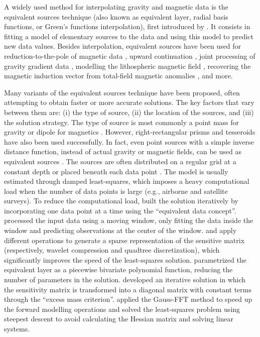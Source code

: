 \documentclass[twocolumn]{article}
\begin{document}
A widely used method for interpolating gravity and magnetic data
is the equivalent sources technique (also known as equivalent layer, radial
basis functions, or Green's functions interpolation), first introduced by
\citet{dampney1969}.
It consists in fitting a model of elementary sources to the data and using this
model to predict new data values.
Besides interpolation, equivalent sources have been used for
reduction-to-the-pole of magnetic data
\citep{silva1986, nakatsuka2006, guspi2009}, upward
continuation \citep{emilia1973, li2010}, joint processing of gravity gradient
data \citep{barnes2011}, modelling the lithospheric magnetic field
\citep{kother2015}, recovering the magnetic induction vector from
total-field magnetic anomalies \citep{li2020}, and more.

Many variants of the equivalent sources technique have been proposed, often
attempting to obtain faster or more accurate solutions.
The key factors that vary between them are: (i) the type of source, (ii)
the location of the sources, and (iii) the solution strategy.
The type of source is most commonly a point mass for gravity or dipole for
magnetics \citep[e.g.,~][]{vonfrese1981, silva1986, mendonca1994, siqueira2017}.
However, right-rectangular prisms \citep[e.g.,][]{barnes2011, jirigalatu2019,
li2020} and tesseroids \citep{bouman2016} have also been used successfully.
In fact, even point sources with a simple inverse distance function, instead of
actual gravity or magnetic fields, can be used as
equivalent sources \citep{cordell1992}.
The sources are often distributed on a regular grid at a constant depth
\citep[e.g.,~][]{leao1989, barnes2011, oliveira2013}
or placed beneath each data point \citep[e.g.,~][]{cordell1992, siqueira2017}.
The model is usually estimated through damped least-squares, which imposes a
heavy computational load when the number of data points is large (e.g.,
airborne and satellite surveys).
To reduce the computational load, \citet{mendonca1994} built the solution
iteratively by incorporating one data point at a time using the ``equivalent
data concept''.
\citet{leao1989} processed the input data using a moving window, only fitting the
data inside the window and predicting observations at the center of the window.
\citet{li2010} and \citet{barnes2011} apply different operations to generate a
sparse representation of the sensitive matrix (respectively, wavelet
compression and quadtree discretization), which significantly improves the
speed of the least-squares solution.
\citet{oliveira2013} parametrized the equivalent layer as a piecewise bivariate
polynomial function, reducing the number of parameters in the solution.
\citet{siqueira2017} developed an iterative solution in which the sensitivity
matrix is transformed into a diagonal matrix with constant terms through the
``excess mass criterion''.
\citet{jirigalatu2019} applied the Gauss-FFT method to speed up the forward
modelling operations and solved the least-squares problem using steepest
descent to avoid calculating the Hessian matrix and solving linear systems.
\end{document}
